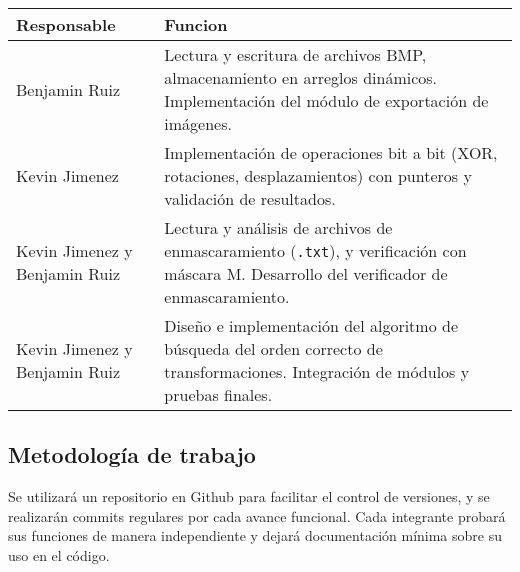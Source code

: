 \documentclass[11pt]{article}
\begin{document}
\begin{center}
\begin{tabular}{|l|p{9cm}|}
\hline
\textbf{Responsable} & \textbf{Funcion} \\
\hline
Benjamin Ruiz & Lectura y escritura de archivos BMP, almacenamiento en arreglos dinámicos. Implementación del módulo de exportación de imágenes. \\
\hline
Kevin Jimenez & Implementación de operaciones bit a bit (XOR, rotaciones, desplazamientos) con punteros y validación de resultados. \\
\hline
Kevin Jimenez y Benjamin Ruiz & Lectura y análisis de archivos de enmascaramiento (\texttt{.txt}), y verificación con máscara M. Desarrollo del verificador de enmascaramiento. \\
\hline
Kevin Jimenez y Benjamin Ruiz & Diseño e implementación del algoritmo de búsqueda del orden correcto de transformaciones. Integración de módulos y pruebas finales. \\
\hline
\end{tabular}
\end{center}

\subsection*{Metodología de trabajo}

Se utilizará un repositorio en Github para facilitar el control de versiones, y se realizarán commits regulares por cada avance funcional. Cada integrante probará sus funciones de manera independiente y dejará documentación mínima sobre su uso en el código.
\end{document}
